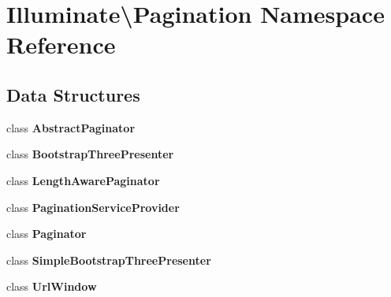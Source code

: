 \section{Illuminate\textbackslash{}Pagination Namespace Reference}
\label{namespace_illuminate_1_1_pagination}
\subsection*{Data Structures}
\begin{DoxyCompactItemize}
\item 
class {\bf Abstract\+Paginator}
\item 
class {\bf Bootstrap\+Three\+Presenter}
\item 
class {\bf Length\+Aware\+Paginator}
\item 
class {\bf Pagination\+Service\+Provider}
\item 
class {\bf Paginator}
\item 
class {\bf Simple\+Bootstrap\+Three\+Presenter}
\item 
class {\bf Url\+Window}
\end{DoxyCompactItemize}
